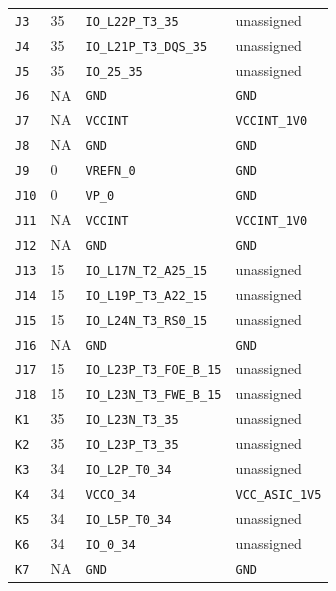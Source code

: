 \documentclass[11pt,a4paper]{article}
\begin{document}
\begin{longtable}{@{}P{13mm}P{13mm}P{78mm}P{62mm}@{}}
\nolinkurl{J3} & 35 & \nolinkurl{IO_L22P_T3_35} & \textcolor{muted}{unassigned} \\
\nolinkurl{J4} & 35 & \nolinkurl{IO_L21P_T3_DQS_35} & \textcolor{muted}{unassigned} \\
\nolinkurl{J5} & 35 & \nolinkurl{IO_25_35} & \textcolor{muted}{unassigned} \\
\nolinkurl{J6} & NA & \nolinkurl{GND} & \nolinkurl{GND} \\
\nolinkurl{J7} & NA & \nolinkurl{VCCINT} & \nolinkurl{VCCINT_1V0} \\
\nolinkurl{J8} & NA & \nolinkurl{GND} & \nolinkurl{GND} \\
\nolinkurl{J9} & 0 & \nolinkurl{VREFN_0} & \nolinkurl{GND} \\
\nolinkurl{J10} & 0 & \nolinkurl{VP_0} & \nolinkurl{GND} \\
\nolinkurl{J11} & NA & \nolinkurl{VCCINT} & \nolinkurl{VCCINT_1V0} \\
\nolinkurl{J12} & NA & \nolinkurl{GND} & \nolinkurl{GND} \\
\nolinkurl{J13} & 15 & \nolinkurl{IO_L17N_T2_A25_15} & \textcolor{muted}{unassigned} \\
\nolinkurl{J14} & 15 & \nolinkurl{IO_L19P_T3_A22_15} & \textcolor{muted}{unassigned} \\
\nolinkurl{J15} & 15 & \nolinkurl{IO_L24N_T3_RS0_15} & \textcolor{muted}{unassigned} \\
\nolinkurl{J16} & NA & \nolinkurl{GND} & \nolinkurl{GND} \\
\nolinkurl{J17} & 15 & \nolinkurl{IO_L23P_T3_FOE_B_15} & \textcolor{muted}{unassigned} \\
\nolinkurl{J18} & 15 & \nolinkurl{IO_L23N_T3_FWE_B_15} & \textcolor{muted}{unassigned} \\
\nolinkurl{K1} & 35 & \nolinkurl{IO_L23N_T3_35} & \textcolor{muted}{unassigned} \\
\nolinkurl{K2} & 35 & \nolinkurl{IO_L23P_T3_35} & \textcolor{muted}{unassigned} \\
\nolinkurl{K3} & 34 & \nolinkurl{IO_L2P_T0_34} & \textcolor{muted}{unassigned} \\
\nolinkurl{K4} & 34 & \nolinkurl{VCCO_34} & \nolinkurl{VCC_ASIC_1V5} \\
\nolinkurl{K5} & 34 & \nolinkurl{IO_L5P_T0_34} & \textcolor{muted}{unassigned} \\
\nolinkurl{K6} & 34 & \nolinkurl{IO_0_34} & \textcolor{muted}{unassigned} \\
\nolinkurl{K7} & NA & \nolinkurl{GND} & \nolinkurl{GND} \\

\end{longtable}
\end{document}

